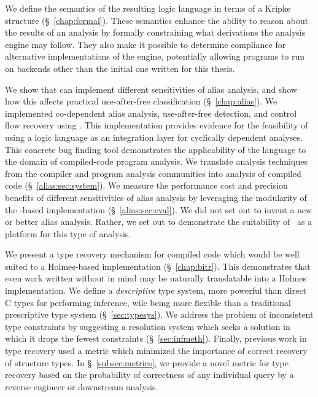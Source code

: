 We define the semantics of the resulting logic language in terms of a Kripke structure (\S~\ref{chap:formal}).
These semantics enhance the ability to reason about the results of an analysis by formally constraining what derivations the analysis engine may follow.
They also make it possible to determine compliance for alternative implementations of the engine, potentially allowing programs to run on backends other than the initial one written for this thesis.

We show that \sysname can implement different sensitivities of alias analysis, and show how this affects practical use-after-free classification (\S~\ref{chap:alias}).
We implemented co-dependent alias analysis, use-after-free detection, and control flow recovery using \sysname.
This implementation provides evidence for the feasibility of using a logic language as an integration layer for cyclically dependent analyses.
This concrete bug finding tool demonstrates the applicability of the \sysname language to the domain of compiled-code program analysis.
We translate analysis techniques from the compiler and program analysis communities into analysis of compiled code (\S~\ref{alias:sec:system}).
We measure the performance cost and precision benefits of different sensitivities of alias analysis by leveraging the modularity of the \sysname-based implementation (\S~\ref{alias:sec:eval}).
We did not set out to invent a new or better alias analysis.
Rather, we set out to demonstrate the suitability of \sysname\ as a platform for this type of analysis.

We present a type recovery mechanism for compiled code which would be well suited to a Holmes-based implementation (\S~\ref{chap:bitr}).
This demonstrates that even work written without \sysname in mind may be naturally translatable into a Holmes implementation.
We define a \emph{descriptive} type system, more powerful than direct C types for performing inference, wile being more flexible than a traditional prescriptive type system (\S~\ref{sec:typesys}).
We address the problem of inconsistent type constraints by suggesting a resolution system which seeks a solution in which it drops the fewest constraints (\S~\ref{sec:infmeth}).
Finally, previous work in type recovery used a metric which minimized the importance of correct recovery of structure types.
In \S~\ref{subsec:metrics}, we provide a novel metric for type recovery based on the probability of correctness of any individual query by a reverse engineer or downstream analysis.
